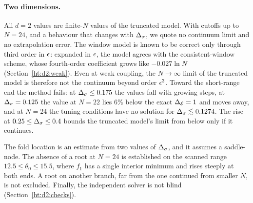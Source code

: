 \paragraph{Two dimensions.}\label{ht:d2:caveats}
All $d=2$ values are finite-$N$ values of the truncated model. With cutoffs up to $N=24$, and a behaviour that changes
with $\Delta_\sigma$, we quote no continuum limit and no extrapolation error. The window model is known to be correct only
through third order in $\epsilon$: expanded in $\epsilon$, the model agrees with the consistent-window scheme, whose
fourth-order coefficient grows like $-0.027\ln N$ (Section~\ref{ht:d2:weak}). Even at weak coupling, the $N\to\infty$
limit of the truncated model is therefore not the continuum beyond order $\epsilon^3$. Toward the short-range end the
method fails: at $\Delta_\sigma\le0.175$ the values fall with growing steps, at $\Delta_\sigma=0.125$ the value at $N=22$ lies $6\%$ below
the exact $\Delta_{\mathcal E}=1$ and moves away, and at $N=24$ the tuning conditions have no solution for $\Delta_\sigma\lesssim0.1274$. The rise
at $0.25\le\Delta_\sigma\le0.4$ bounds the truncated model's limit from below only if it continues.

The fold location is an estimate from two values of $\Delta_\sigma$, and it assumes a saddle-node. The absence of a root at
$N=24$ is established on the scanned range $12.5\le\theta_0\le15.5$, where $f_1$ has a single interior minimum and rises
steeply at both ends. A root on another branch, far from the one continued from smaller $N$, is not excluded. Finally,
the independent solver is not blind (Section~\ref{ht:d2:checks}).
